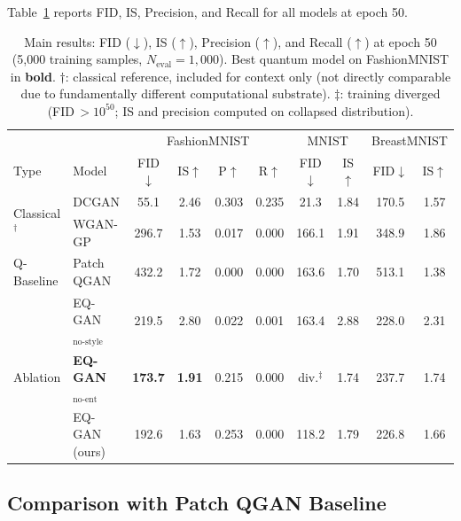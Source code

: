 \documentclass[twocolumn]{article}
\begin{document}
Table~\ref{tab:main_results} reports FID, IS, Precision, and Recall for all
models at epoch 50.

\begin{table}[t]
  \centering
  \caption{Main results: FID ($\downarrow$), IS ($\uparrow$), Precision ($\uparrow$),
    and Recall ($\uparrow$) at epoch 50 (5{,}000 training samples, $N_\text{eval}=1{,}000$).
    Best quantum model on FashionMNIST in \textbf{bold}.
    $\dagger$: classical reference, included for context only (not directly comparable
    due to fundamentally different computational substrate).
    $\ddagger$: training diverged (FID\,$>10^{50}$; IS and precision computed on collapsed distribution).}
  \label{tab:main_results}
  \small
  \begin{tabular}{llcccccccc}
    \toprule
    & & \multicolumn{4}{c}{FashionMNIST} & \multicolumn{2}{c}{MNIST} & \multicolumn{2}{c}{BreastMNIST} \\
    \cmidrule(lr){3-6}\cmidrule(lr){7-8}\cmidrule(lr){9-10}
    Type & Model & FID$\downarrow$ & IS$\uparrow$ & P$\uparrow$ & R$\uparrow$
         & FID$\downarrow$ & IS$\uparrow$ & FID$\downarrow$ & IS$\uparrow$ \\
    \midrule
    \multirow{2}{*}{Classical$^\dagger$}
      & DCGAN   & 55.1  & 2.46 & 0.303 & 0.235 & 21.3  & 1.84 & 170.5 & 1.57 \\
      & WGAN-GP & 296.7 & 1.53 & 0.017 & 0.000 & 166.1 & 1.91 & 348.9 & 1.86 \\
    \midrule
    \multirow{1}{*}{Q-Baseline}
      & Patch QGAN  & 432.2 & 1.72 & 0.000 & 0.000 & 163.6 & 1.70 & 513.1 & 1.38 \\
    \midrule
    \multirow{3}{*}{Ablation}
      & EQ-GAN$_\text{no-style}$ & 219.5 & 2.80 & 0.022 & 0.001 & 163.4 & 2.88 & 228.0 & 2.31 \\
      & \textbf{EQ-GAN$_\text{no-ent}$} & \textbf{173.7} & \textbf{1.91} & 0.215 & 0.000 & div.$^{\ddagger}$ & 1.74 & 237.7 & 1.74 \\
      & EQ-GAN (ours)  & 192.6 & 1.63 & 0.253 & 0.000 & 118.2 & 1.79 & 226.8 & 1.66 \\
    \bottomrule
  \end{tabular}
\end{table}

\subsection{Comparison with Patch QGAN Baseline}
\end{document}
